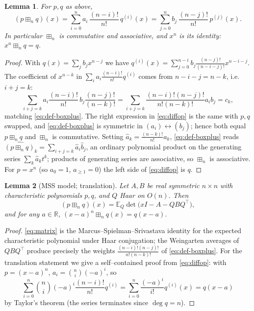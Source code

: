 \documentclass[12pt]{article}
\newtheorem{lemma}{Lemma}
\theoremstyle{definition}
\newcommand{\bR}{\mathbb{R}}
\newcommand{\bE}{\mathbb{E}}
\newcommand{\boxp}{\boxplus_n}
\begin{document}
\begin{lemma}\label{lem:diffop}
For $p,q$ as above,
\begin{equation}\label{eq:diffop}
(p\boxp q)(x)=\sum_{i=0}^{n} a_i\,\frac{(n-i)!}{n!}\,q^{(i)}(x)
            =\sum_{j=0}^{n} b_j\,\frac{(n-j)!}{n!}\,p^{(j)}(x).
\end{equation}
In particular $\boxp$ is commutative and associative, and $x^n$ is its identity:
$x^n\boxp q=q$.
\end{lemma}

\begin{proof}
With $q(x)=\sum_{j} b_j x^{n-j}$ we have
$q^{(i)}(x)=\sum_{j=0}^{n-i} b_j\frac{(n-j)!}{(n-i-j)!}x^{n-i-j}$. The coefficient of
$x^{n-k}$ in $\sum_i a_i\frac{(n-i)!}{n!}q^{(i)}$ comes from $n-i-j=n-k$, i.e.\ $i+j=k$:
\[
\sum_{i+j=k}a_i\frac{(n-i)!}{n!}\,b_j\frac{(n-j)!}{(n-k)!}
=\sum_{i+j=k}\frac{(n-i)!(n-j)!}{n!(n-k)!}a_i b_j=c_k,
\]
matching \eqref{eq:def-boxplus}. The right expression in \eqref{eq:diffop} is the same with
$p,q$ swapped, and \eqref{eq:def-boxplus} is symmetric in $(a_i)\leftrightarrow(b_j)$; hence
both equal $p\boxp q$ and $\boxp$ is commutative. Setting $\hat a_k=\frac{(n-k)!}{n!}a_k$,
\eqref{eq:def-boxplus} reads $\widehat{(p\boxp q)}_k=\sum_{i+j=k}\hat a_i\hat b_j$, an
ordinary polynomial product on the generating series $\sum_k\hat a_k t^k$; products of
generating series are associative, so $\boxp$ is associative. For $p=x^n$ (so $a_0=1$,
$a_{\ge1}=0$) the left side of \eqref{eq:diffop} is $q$.
\end{proof}

\begin{lemma}[MSS model; translation]\label{lem:matrix}
Let $A,B$ be real symmetric $n\times n$ with characteristic polynomials $p,q$, and $Q$ Haar
on $O(n)$. Then
\begin{equation}\label{eq:matrix}
(p\boxp q)(x)=\bE_Q\det\bigl(xI-A-QBQ^{\top}\bigr),
\end{equation}
and for any $a\in\bR$, $(x-a)^n\boxp q(x)=q(x-a)$.
\end{lemma}

\begin{proof}
\eqref{eq:matrix} is the Marcus--Spielman--Srivastava identity for the expected
characteristic polynomial under Haar conjugation; the Weingarten averages of $QBQ^\top$
produce precisely the weights $\frac{(n-i)!(n-j)!}{n!(n-k)!}$ of \eqref{eq:def-boxplus}.
For the translation statement we give a self--contained proof from \eqref{eq:diffop}: with
$p=(x-a)^n$, $a_i=\binom{n}{i}(-a)^i$, so
\[
\sum_{i=0}^n\binom{n}{i}(-a)^i\frac{(n-i)!}{n!}q^{(i)}
=\sum_{i=0}^n\frac{(-a)^i}{i!}q^{(i)}(x)=q(x-a)
\]
by Taylor's theorem (the series terminates since $\deg q=n$).
\end{proof}
\end{document}
